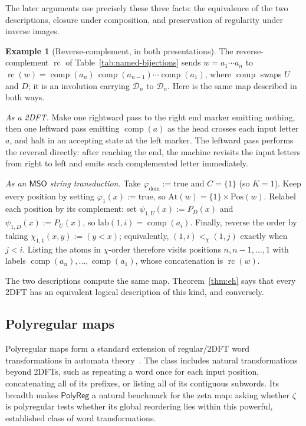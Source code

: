 \documentclass[11pt]{article}
\theoremstyle{definition}
\newtheorem{example}[theorem]{Example}
\newcommand{\D}{\mathcal D}
\newcommand{\MSO}{\mathsf{MSO}}
\newcommand{\polyreg}{\mathsf{PolyReg}}
\newcommand{\rc}{\operatorname{rc}}
\newcommand{\comp}{\operatorname{comp}}
\begin{document}
The later arguments use precisely these three facts: the equivalence of the
two descriptions, closure under composition, and preservation of regularity
under inverse images.

\begin{example}[Reverse-complement, in both presentations]\label{ex:rc-two-ways}
The reverse-complement $\rc$ of Table~\ref{tab:named-bijections} sends
$w=a_1\cdots a_n$ to $\rc(w)=\comp(a_n)\,\comp(a_{n-1})\cdots\comp(a_1)$, where
$\comp$ swaps $U$ and $D$; it is an involution carrying $\D_n$ to $\D_n$.  Here
is the same map described in both ways.

\vspace{0.5em}
\noindent\emph{As a 2DFT.}  Make one rightward pass to the right end marker emitting
nothing, then one leftward pass emitting $\comp(a)$ as the head crosses each
input letter $a$, and halt in an accepting state at the left marker.  The
leftward pass performs the reversal directly: after reaching the end, the
machine revisits the input letters from right to left and emits each
complemented letter immediately.

\vspace{0.5em}
\noindent\emph{As an $\MSO$ string transduction.}  Take
$\varphi_{\mathrm{dom}}:=\mathrm{true}$ and $C=\{1\}$ (so $K=1$).  Keep every
position by setting $\varphi_1(x):=\mathrm{true}$, so
$\mathrm{At}(w)=\{1\}\times\mathrm{Pos}(w)$.  Relabel each position by its
complement: set $\psi_{1,U}(x):=P_D(x)$ and
$\psi_{1,D}(x):=P_U(x)$, so $\mathrm{lab}(1,i)=\comp(a_i)$.  Finally, reverse
the order by taking $\chi_{1,1}(x,y):=(y<x)$; equivalently,
$(1,i)<_\chi(1,j)$ exactly when $j<i$.  Listing the atoms in $\chi$-order
therefore visits positions $n,n-1,\ldots,1$ with labels
$\comp(a_n),\ldots,\comp(a_1)$, whose concatenation is $\rc(w)$.

The two descriptions compute the same map.  Theorem~\ref{thm:eh} says that
every 2DFT has an equivalent logical description of this kind, and conversely.
\end{example}

\subsection{Polyregular maps}\label{sec:polyreg}

Polyregular maps form a standard extension of regular/2DFT word transformations
in automata theory~\cite{Bojanczyk2018}.  The class includes
natural transformations beyond 2DFTs, such as repeating a word once for each
input position, concatenating all of its prefixes, or listing all of its
contiguous subwords.  Its breadth makes $\polyreg$ a natural benchmark for the zeta map:
asking whether $\zeta$ is polyregular tests whether its global reordering lies
within this powerful, established class of word transformations.
\end{document}
